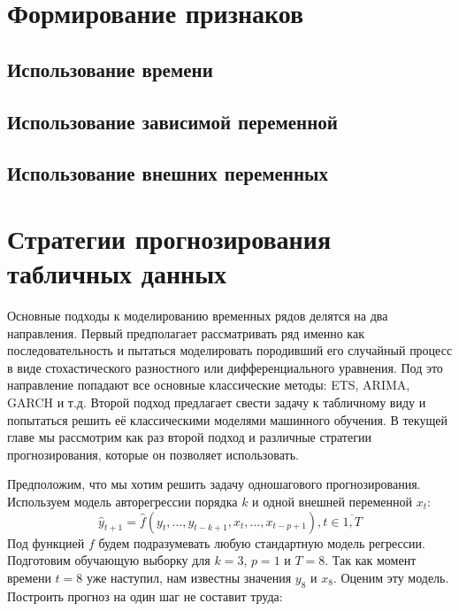 \documentclass[12pt,fleqn]{article}
\begin{document}
\section{Формирование признаков}

\subsection{Использование времени}

\subsection{Использование зависимой переменной}

\subsection{Использование внешних переменных}

\section{Стратегии прогнозирования табличных данных}

Основные подходы к моделированию временных рядов делятся на два направления.
Первый предполагает рассматривать ряд именно как последовательность и пытаться моделировать породивший его случайный процесс в виде стохастического разностного или дифференциального уравнения.
Под это направление попадают все основные классические методы: ETS, ARIMA, GARCH и т.д.
Второй подход предлагает свести задачу к табличному виду и попытаться решить её классическими моделями машинного обучения.
В текущей главе мы рассмотрим как раз второй подход и различные стратегии прогнозирования, которые он позволяет использовать.

Предположим, что мы хотим решить задачу одношагового прогнозирования.
Используем модель авторегрессии порядка $k$ и одной внешней переменной $x_t$:
\begin{equation}
  \hat{y}_{t+1} = \hat{f}(y_t, \ldots, y_{t-k+1}, x_{t}, \ldots, x_{t-p+1}), t \in \overline{1, T}
\end{equation}
Под функцией $f$ будем подразумевать любую стандартную модель регрессии.
Подготовим обучающую выборку для $k=3$, $p=1$ и $T=8$.
Так как момент времени $t=8$ уже наступил, нам известны значения $y_8$ и $x_8$.
Оценим эту модель.
Построить прогноз на один шаг не составит труда:
\end{document}
